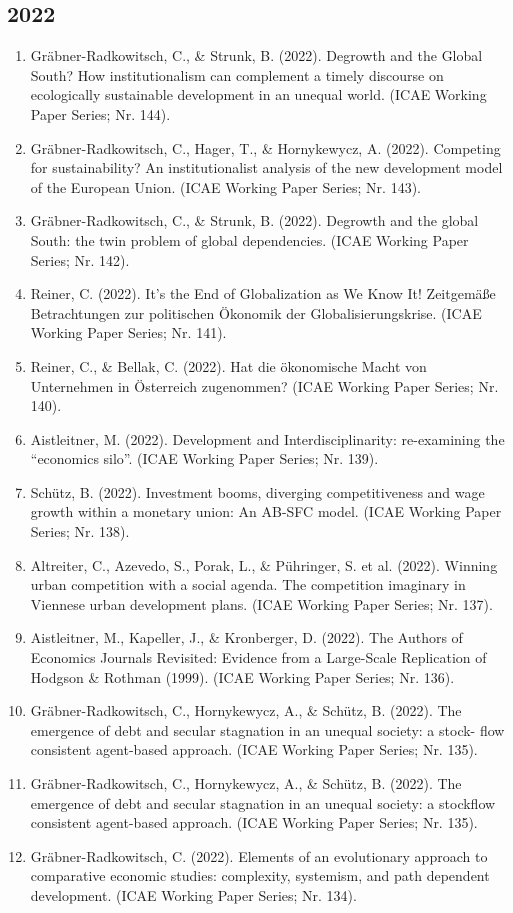 \subsection*{2022}
\begin{enumerate}
	 \item Gräbner-Radkowitsch, C., \& Strunk, B. (2022). Degrowth and the Global South? How institutionalism can complement a timely discourse on ecologically sustainable development in an unequal world. (ICAE Working Paper Series; Nr. 144).
	 \item Gräbner-Radkowitsch, C., Hager, T., \& Hornykewycz, A. (2022). Competing for sustainability? An institutionalist analysis of the new development model of the European Union. (ICAE Working Paper Series; Nr. 143).
	 \item Gräbner-Radkowitsch, C., \& Strunk, B. (2022). Degrowth and the global South: the twin problem of global dependencies. (ICAE Working Paper Series; Nr. 142).
	 \item Reiner, C. (2022). It’s the End of Globalization as We Know It! Zeitgemäße Betrachtungen zur politischen Ökonomik der Globalisierungskrise. (ICAE Working Paper Series; Nr. 141).
	 \item Reiner, C., \& Bellak, C. (2022). Hat die ökonomische Macht von Unternehmen in Österreich zugenommen? (ICAE Working Paper Series; Nr. 140).
	 \item Aistleitner, M. (2022). Development and Interdisciplinarity: re-examining the “economics silo”. (ICAE Working Paper Series; Nr. 139).
	 \item Schütz, B. (2022). Investment booms, diverging competitiveness and wage growth within a monetary union: An AB-SFC model. (ICAE Working Paper Series; Nr. 138).
	 \item Altreiter, C., Azevedo, S., Porak, L., \& Pühringer, S. et al. (2022). Winning urban competition with a social agenda. The competition imaginary in Viennese urban development plans. (ICAE Working Paper Series; Nr. 137).
	 \item Aistleitner, M., Kapeller, J., \& Kronberger, D. (2022). The Authors of Economics Journals Revisited: Evidence from a Large-Scale Replication of Hodgson \& Rothman (1999). (ICAE Working Paper Series; Nr. 136).
	 \item Gräbner-Radkowitsch, C., Hornykewycz, A., \& Schütz, B. (2022). The emergence of debt and secular stagnation in an unequal society: a stock- flow consistent agent-based approach. (ICAE Working Paper Series; Nr. 135).
	 \item Gräbner-Radkowitsch, C., Hornykewycz, A., \& Schütz, B. (2022). The emergence of debt and secular stagnation in an unequal society: a stockflow consistent agent-based approach. (ICAE Working Paper Series; Nr. 135).
	 \item Gräbner-Radkowitsch, C. (2022). Elements of an evolutionary approach to comparative economic studies: complexity, systemism, and path dependent development. (ICAE Working Paper Series; Nr. 134).
\end{enumerate}
